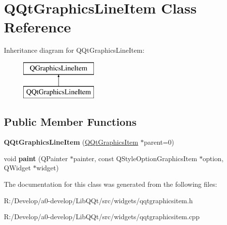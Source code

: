 \hypertarget{class_q_qt_graphics_line_item}{}\section{Q\+Qt\+Graphics\+Line\+Item Class Reference}
\label{class_q_qt_graphics_line_item}
Inheritance diagram for Q\+Qt\+Graphics\+Line\+Item\+:\begin{figure}[H]
\begin{center}
\leavevmode
\includegraphics[height=2.000000cm]{class_q_qt_graphics_line_item}
\end{center}
\end{figure}
\subsection*{Public Member Functions}
\begin{DoxyCompactItemize}
\item 
\mbox{\label{class_q_qt_graphics_line_item_a973b40c3de1528bbddfd896a75a802f4}} 
{\bfseries Q\+Qt\+Graphics\+Line\+Item} (\mbox{\hyperlink{class_q_qt_graphics_item}{Q\+Qt\+Graphics\+Item}} $\ast$parent=0)
\item 
\mbox{\label{class_q_qt_graphics_line_item_a86a84779e07be51f85e1248f2e330a32}} 
void {\bfseries paint} (Q\+Painter $\ast$painter, const Q\+Style\+Option\+Graphics\+Item $\ast$option, Q\+Widget $\ast$widget)
\end{DoxyCompactItemize}


The documentation for this class was generated from the following files\+:\begin{DoxyCompactItemize}
\item 
R\+:/\+Develop/a0-\/develop/\+Lib\+Q\+Qt/src/widgets/qqtgraphicsitem.\+h\item 
R\+:/\+Develop/a0-\/develop/\+Lib\+Q\+Qt/src/widgets/qqtgraphicsitem.\+cpp\end{DoxyCompactItemize}

